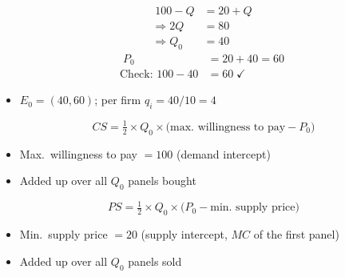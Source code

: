 \documentclass{beamer}
\begin{document}
\begin{frame}[plain,label=w3_wt2_equilibrium]
  \Large
  \begin{align*}
    \tag{5}\;100 - Q &= 20 + Q\\
    \Rightarrow 2Q &= 80\\
    \Rightarrow Q_0 &= 40
  \end{align*}
  \begin{align*}
    \tag{6}\;P_0 &= 20 + 40 = 60\\
    \text{Check: } 100 - 40 &= 60 \;\checkmark
  \end{align*}
  \vspace{0.2em}
  \begin{itemize}\Large
    \item $E_0 = (40, 60)$; per firm $q_i = 40/10 = 4$
  \end{itemize}
\end{frame}

\begin{frame}[plain,label=w3_wt2_cs_def]
  \Large
  \[
    \tag{7}\;CS = \tfrac{1}{2} \times Q_0 \times \bigl(\text{max.\ willingness to pay} - P_0\bigr)
  \]
  \vspace{0.3em}
  \begin{itemize}\Large
    \item Max.\ willingness to pay $= 100$ (demand intercept)
    \item Added up over all $Q_0$ panels bought
  \end{itemize}
\end{frame}

\begin{frame}[plain,label=w3_wt2_ps_def]
  \Large
  \[
    \tag{8}\;PS = \tfrac{1}{2} \times Q_0 \times \bigl(P_0 - \text{min.\ supply price}\bigr)
  \]
  \vspace{0.3em}
  \begin{itemize}\Large
    \item Min.\ supply price $= 20$ (supply intercept, $MC$ of the first panel)
    \item Added up over all $Q_0$ panels sold
  \end{itemize}
\end{frame}
\end{document}
